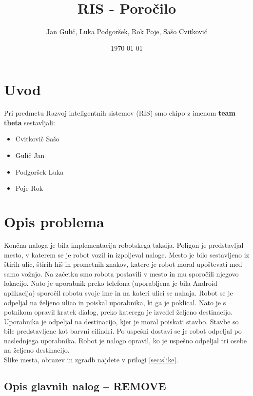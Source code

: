 \documentclass[a4paper,11pt]{article}
\title{RIS - Poročilo}
\author{Jan Gulič, Luka Podgoršek, Rok Poje, Sašo Cvitkovič}
\date{\today}
\begin{document}
\maketitle
\section{Uvod}

Pri predmetu Razvoj inteligentnih sistemov (RIS) smo ekipo z imenom \textbf{team theta} sestavljali:
\begin{itemize}
	\item Cvitkovič Sašo
	\item Gulič Jan
	\item Podgoršek Luka
	\item Poje Rok
\end{itemize}


\section{Opis problema}

Končna naloga je bila implementacija robotskega taksija. Poligon je predstavljal mesto, v katerem se je robot vozil in izpoljeval naloge. Mesto je bilo sestavljeno iz štirih ulic, štirih hiš in prometnih znakov, katere je robot moral upoštevati med samo vožnjo. Na začetku smo robota postavili v mesto in mu sporočili njegovo lokacijo. Nato je uporabnik preko telefona (uporabljena je bila Android aplikacija) sporočil robotu svoje ime in na kateri ulici se nahaja. Robot se je odpeljal na željeno ulico in poiskal uporabnika, ki ga je poklical. Nato je s potnikom opravil kratek dialog, preko katerega je izvedel željeno destinacijo. Uporabnika je odpeljal na destinacijo, kjer je moral poiskati stavbo. Stavbe so bile predstavljene kot barvni cilindri. Po uspešni dostavi se je robot odpeljal po naslednjega uporabnika. 
Robot je nalogo opravil, ko je uspešno odpeljal tri osebe na željeno destinacijo.\\


Slike mesta, obrazev in zgradb najdete v prilogi \ref{sec:slike}.


\subsection{Opis glavnih nalog -- REMOVE}
\end{document}
